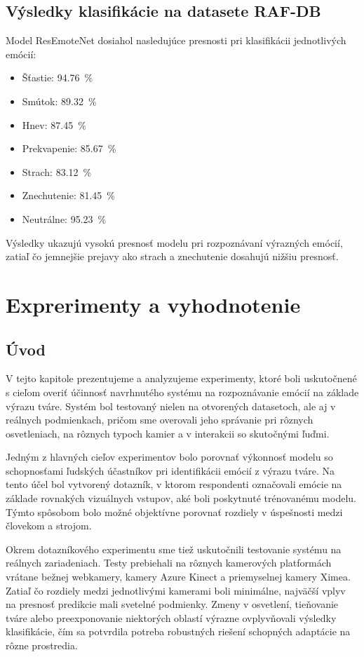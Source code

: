 \subsection{Výsledky klasifikácie na datasete RAF-DB}
Model ResEmoteNet dosiahol nasledujúce presnosti pri klasifikácii jednotlivých emócií:
\begin{itemize}
    \item Šťastie: 94.76~\%
    \item Smútok: 89.32~\%
    \item Hnev: 87.45~\%
    \item Prekvapenie: 85.67~\%
    \item Strach: 83.12~\%
    \item Znechutenie: 81.45~\%
    \item Neutrálne: 95.23~\%
\end{itemize}

Výsledky ukazujú vysokú presnosť modelu pri rozpoznávaní výrazných emócií, zatiaľ čo jemnejšie prejavy ako strach a znechutenie dosahujú nižšiu presnosť.



\section{Exprerimenty a vyhodnotenie}
\label{sec:experiments}
\subsection{Úvod}
V tejto kapitole prezentujeme a analyzujeme experimenty, ktoré boli uskutočnené s cieľom overiť účinnosť navrhnutého systému na rozpoznávanie emócií na základe výrazu tváre. Systém bol testovaný nielen na otvorených datasetoch, ale aj v reálnych podmienkach, pričom sme overovali jeho správanie pri rôznych osvetleniach, na rôznych typoch kamier a v interakcii so skutočnými ľuďmi.

Jedným z hlavných cieľov experimentov bolo porovnať výkonnosť modelu so schopnosťami ľudských účastníkov pri identifikácii emócií z výrazu tváre. Na tento účel bol vytvorený dotazník, v ktorom respondenti označovali emócie na základe rovnakých vizuálnych vstupov, aké boli poskytnuté trénovanému modelu. Týmto spôsobom bolo možné objektívne porovnať rozdiely v úspešnosti medzi človekom a strojom.

Okrem dotazníkového experimentu sme tiež uskutočnili testovanie systému na reálnych zariadeniach. Testy prebiehali na rôznych kamerových platformách vrátane bežnej webkamery, kamery Azure Kinect a priemyselnej kamery Ximea. Zatiaľ čo rozdiely medzi jednotlivými kamerami boli minimálne, najväčší vplyv na presnosť predikcie mali svetelné podmienky. Zmeny v osvetlení, tieňovanie tváre alebo preexponovanie niektorých oblastí výrazne ovplyvňovali výsledky klasifikácie, čím sa potvrdila potreba robustných riešení schopných adaptácie na rôzne prostredia.

